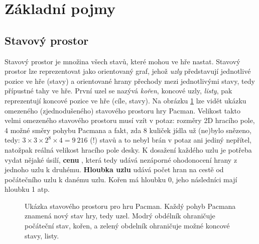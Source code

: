 \section{Základní pojmy}

\subsection*{Stavový prostor}
Stavový prostor \cite{AI1} je množina všech stavů, které mohou ve hře nastat. Stavový prostor lze reprezentovat jako orientovaný graf, jehož \textit{uzly} představují jednotlivé pozice ve hře (stavy) a orientované hrany přechody mezi jednotlivými stavy, tedy přípustné tahy ve hře. První uzel se nazývá \textit{kořen}, koncové uzly, \textit{listy}, pak reprezentují koncové pozice ve hře (cíle, stavy). Na obrázku \ref{img:stavp} lze vidět ukázku omezeného (zjednodušeného) stavového prostoru hry Pacman. Velikost takto velmi omezeného stavového prostoru musí vzít v potaz: rozměry 2D hracího pole, 4 možné směry pohybu Pacmana a fakt, zda 8 kuliček jídla už (ne)bylo snězeno, tedy:  $3 \times 3 \times 2^{8} \times 4 = 9\:216$ (!) stavů a to nebyl brán v potaz ani jediný nepřítel, natožpak reálná velikost hracího pole desky.
\newline
K dosažení každého uzlu je potřeba vydat nějaké úsilí, \textbf{cenu} \cite{AI1}, která tedy udává nezáporné ohodonocení hrany z jednoho uzlu k druhému. \textbf{Hloubka uzlu} \cite{AI1} udává počet hran na cestě od počátečního uzlu k danému uzlu. Kořen má hloubku 0, jeho následníci mají hloubku 1 atp.


\begin{figure}[h]
\begin{center}
  \caption{Ukázka stavového prostoru pro hru Pacman. Každý pohyb Pacmana znamená nový stav hry, tedy uzel. Modrý obdélník ohraničuje počáteční stav, kořen, a zelený obdelník ohraničuje možné koncové stavy, listy.}
  \label{img:stavp}
\end{center}
\end{figure}

